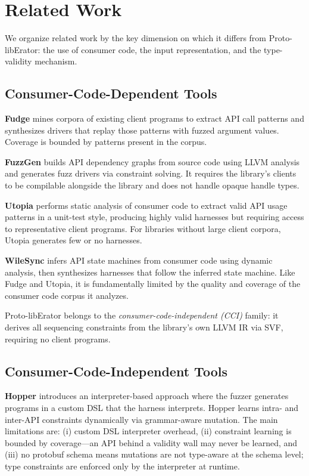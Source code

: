 \documentclass[sigconf,anonymous]{acmart}
\begin{document}
\section{Related Work}
\label{sec:related}

We organize related work by the key dimension on which it differs from
Proto-libErator: the use of consumer code, the input representation, and
the type-validity mechanism.

\subsection*{Consumer-Code-Dependent Tools}

\textbf{Fudge} \cite{fudge19} mines corpora of existing client programs
to extract API call patterns and synthesizes drivers that replay those
patterns with fuzzed argument values.  Coverage is bounded by patterns
present in the corpus.

\textbf{FuzzGen} \cite{fuzzgen19} builds API dependency graphs from
source code using LLVM analysis and generates fuzz drivers via constraint
solving.  It requires the library's clients to be compilable alongside
the library and does not handle opaque handle types.

\textbf{Utopia} \cite{utopia22} performs static analysis of consumer
code to extract valid API usage patterns in a unit-test style, producing
highly valid harnesses but requiring access to representative client
programs.  For libraries without large client corpora, Utopia generates
few or no harnesses.

\textbf{WileSync} \cite{wildsync23} infers API state machines from
consumer code using dynamic analysis, then synthesizes harnesses that
follow the inferred state machine.  Like Fudge and Utopia, it is
fundamentally limited by the quality and coverage of the consumer code
corpus it analyzes.

Proto-libErator belongs to the \emph{consumer-code-independent (CCI)}
family: it derives all sequencing constraints from the library's own
LLVM IR via SVF, requiring no client programs.

\subsection*{Consumer-Code-Independent Tools}

\textbf{Hopper} \cite{hopper_ccs23} introduces an interpreter-based
approach where the fuzzer generates programs in a custom DSL that the
harness interprets.  Hopper learns intra- and inter-API constraints
dynamically via grammar-aware mutation.  The main limitations are:
(i) custom DSL interpreter overhead, (ii) constraint learning is bounded
by coverage---an API behind a validity wall may never be learned, and
(iii) no protobuf schema means mutations are not type-aware at the
schema level; type constraints are enforced only by the interpreter at
runtime.
\end{document}

